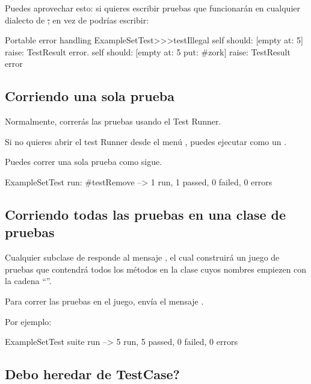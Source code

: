 \documentclass[a4paper,10pt,twoside]{book}
\begin{document}
Puedes aprovechar esto: si quieres escribir pruebas que funcionar\'an en cualquier dialecto de \st, en vez de
 podr\'ias escribir:

\begin{method}[portabletestillegal]{Portable error handling}
ExampleSetTest>>>testIllegal
	self should: [empty at: 5] raise: TestResult error.
	self should: [empty at: 5 put: #zork] raise: TestResult error
\end{method}


\subsection{Corriendo una sola prueba}
Normalmente, correr\'as las pruebas usando el Test Runner.

Si no quieres abrir el test Runner desde el men\'u ,
puedes ejecutar  como un .

Puedes correr una sola prueba como sigue.

\begin{code}{}
ExampleSetTest run: #testRemove --> 1 run, 1 passed, 0 failed, 0 errors
\end{code}

\subsection{Corriendo todas las pruebas en una clase de pruebas}

Cualquier subclase de  responde al mensaje , el cual
construir\'a un juego de pruebas que contendr\'a todos los
m\'etodos en la clase cuyos nombres empiezen con la cadena ``''.

Para correr las pruebas en el juego, env\'ia el mensaje .

Por ejemplo:

\begin{code}{}
ExampleSetTest suite run --> 5 run, 5 passed, 0 failed, 0 errors
\end{code}

\subsection{\¿ Debo heredar de TestCase?}
\end{document}
